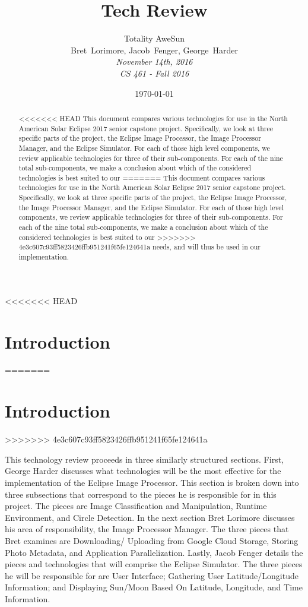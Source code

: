 \documentclass[10pt, onecolumn, draftclsnofoot, letterpaper, compsoc]{IEEEtran}
\title{Tech Review}
\date{\today} %
\author{Totality AweSun \\
		Bret~Lorimore, Jacob~Fenger, George~Harder \\
		\textit{November 14th, 2016 \\
		CS 461 - Fall 2016}}
\begin{document}
\maketitle

\begin{abstract}

<<<<<<< HEAD
This document compares various technologies for use in the North American Solar
Eclipse 2017 senior capstone project. Specifically, we look at three specific parts
of the project, the Eclipse Image Processor, the Image Processor Manager, and the
Eclipse Simulator. For each of those high level components, we review applicable
technologies for three of their sub-components. For each of the nine total sub-components,
we make a conclusion about which of the considered technologies is best suited to our
=======
This document compares various technologies for use in the North American Solar
Eclipse 2017 senior capstone project. Specifically, we look at three specific parts
of the project, the Eclipse Image Processor, the Image Processor Manager, and the
Eclipse Simulator. For each of those high level components, we review applicable
technologies for three of their sub-components. For each of the nine total sub-components,
we make a conclusion about which of the considered technologies is best suited to our
>>>>>>> 4e3c607c93ff5823426ffb951241f65fe124641a
needs, and will thus be used in our implementation.

\end{abstract}

\newpage

<<<<<<< HEAD
\section{Introduction}
=======
\section{Introduction}
>>>>>>> 4e3c607c93ff5823426ffb951241f65fe124641a

This technology review proceeds in three similarly structured sections. First,
George Harder discusses what technologies will be the most effective for the
implementation of the Eclipse Image Processor. This section is broken down into
three subsections that correspond to the pieces he is responsible for in this
project. The pieces are Image Classification and Manipulation, Runtime
Environment, and Circle Detection. In the next section Bret Lorimore discusses
his area of responsibility, the Image Processor Manager. The three pieces that
Bret examines are Downloading/ Uploading from Google Cloud Storage, Storing
Photo Metadata, and Application Parallelization. Lastly, Jacob Fenger details
the pieces and technologies that will comprise the Eclipse Simulator. The three
pieces he will be responsible for are User Interface; Gathering User
Latitude/Longitude Information; and Displaying Sun/Moon Based On Latitude,
Longitude, and Time Information. \\
\end{document}
